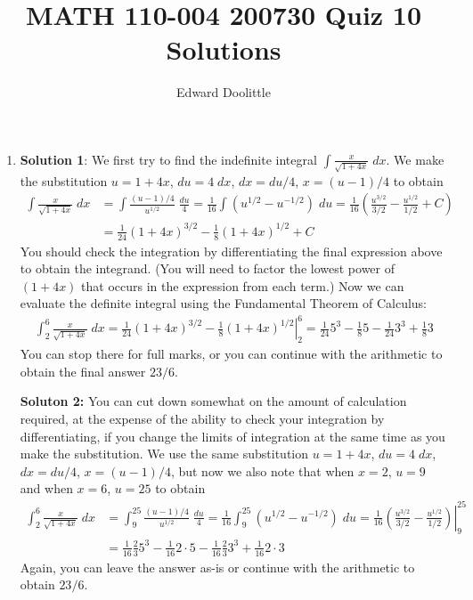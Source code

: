 \documentclass[12pt]{article}
\title{MATH 110-004 200730 Quiz 10 Solutions}
\author{Edward Doolittle}
\newcommand{\ds}{\displaystyle}
\begin{document}
\maketitle

\begin{enumerate}
\item \textbf{Solution 1}: 
  We first try to find the indefinite integral
  $\ds \int \frac{x}{\sqrt{1+4x}} \; dx$.  We make the substitution
  $u=1+4x$, $du = 4\; dx$, $dx = du/4$, $x=(u-1)/4$ to obtain
  \begin{align*}
    \int \frac{x}{\sqrt{1+4x}} \; dx
    &= \int \frac{(u-1)/4}{u^{1/2}} \; \frac{du}{4}
    = \frac{1}{16} \int (u^{1/2} - u^{-1/2}) \; du
    = \frac{1}{16} \left(\frac{u^{3/2}}{3/2} - \frac{u^{1/2}}{1/2} +C\right)
    \\
    &= \frac{1}{24} (1+4x)^{3/2} - \frac{1}{8}(1+4x)^{1/2} + C
  \end{align*}
  You should check the integration by differentiating the final expression
  above to obtain the integrand.  (You will need to factor the lowest power
  of $(1+4x)$ that occurs in the expression from each term.)  Now we
  can evaluate the definite integral using the Fundamental Theorem of Calculus:
  \begin{align*}
    \int_2^6 \frac{x}{\sqrt{1+4x}} \; dx
    = \left. \frac{1}{24} (1+4x)^{3/2} - \frac{1}{8}(1+4x)^{1/2} \right|_2^6
    = \frac{1}{24} 5^3 - \frac{1}{8} 5 - \frac{1}{24} 3^3 + \frac{1}{8} 3
  \end{align*}
  You can stop there for full marks, or you can continue with the arithmetic
  to obtain the final answer $23/6$.

  \textbf{Soluton 2:} You can cut down somewhat on the amount of calculation
  required, at the expense of the ability to check your integration by 
  differentiating, if you change the limits of integration at the same time
  as you make the substitution.  We use the same substitution
  $u=1+4x$, $du = 4\; dx$, $dx = du/4$, $x=(u-1)/4$, but now we also note
  that when $x=2$, $u=9$ and when $x=6$, $u=25$ to obtain
  \begin{align*}
    \int_2^6 \frac{x}{\sqrt{1+4x}} \; dx
    &= \int_9^{25} \frac{(u-1)/4}{u^{1/2}} \; \frac{du}{4}
    = \frac{1}{16} \int_9^{25} (u^{1/2}-u^{-1/2}) \; du
    = \frac{1}{16} \left. 
      \left( \frac{u^{3/2}}{3/2} - \frac{u^{1/2}}{1/2} \right)
    \right|_9^{25}
    \\
    &= \frac{1}{16} \frac{2}{3} 5^3 - \frac{1}{16} 2\cdot 5
    - \frac{1}{16} \frac{2}{3} 3^3 + \frac{1}{16} 2 \cdot 3
  \end{align*}
  Again, you can leave the answer as-is or continue with the arithmetic
  to obtain $23/6$.


\end{enumerate}
\end{document}
